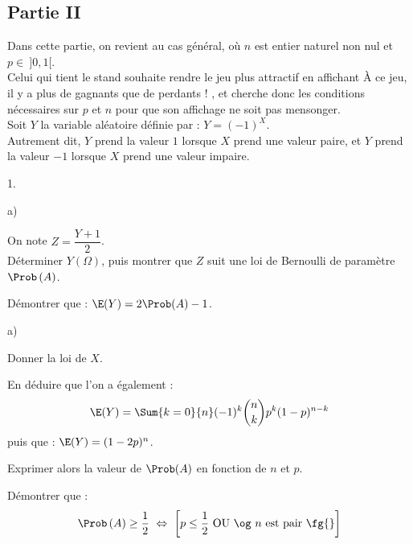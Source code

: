 \documentclass[11pt]{article}%
\begin{document}


\subsection*{Partie II}

\noindent
Dans cette partie, on revient au cas général, où $n$ est entier
naturel non nul et $p \in \ ]0,1[$.\\
Celui qui tient le stand souhaite rendre le jeu plus attractif en
affichant \og À ce jeu, il y a plus de gagnants que de perdants ! \fg,
et cherche donc les conditions nécessaires sur $p$ et $n$ pour que son
affichage ne soit pas mensonger.\\
Soit $Y$ la variable aléatoire définie par : $Y = (-1)^{X}$.\\
Autrement dit, $Y$ prend la valeur $1$ lorsque $X$ prend une valeur
paire, et $Y$ prend la valeur $-1$ lorsque $X$ prend une valeur
impaire.
\begin{noliste}{1.}
  \setlength{\itemsep}{4mm}
\item
  \begin{noliste}{a)} 
    \setlength{\itemsep}{2mm}
  \item On note $Z = \dfrac{Y + 1}{2}$.\\[.2cm]
    Déterminer $Y(\Omega)$, puis montrer que $Z$ suit une loi de
    Bernoulli de paramètre $\Prob\left( A \right)$.

    

  \item Démontrer que : $\E(Y) = 2 \Prob(A) - 1$.

    
  \end{noliste}




\item 
  \begin{noliste}{a)}
    \setlength{\itemsep}{2mm}
  \item Donner la loi de $X$.

    

  \item En déduire que l'on a également : 
    \[
    \E(Y) = \Sum{k = 0}{n} (-1)^{k} \dbinom{n}{k} p^{k}(1-p)^{n-k}
    \]
    puis que : $\E(Y) = (1-2p)^{n}$.

    
  \end{noliste}

\item Exprimer alors la valeur de $\Prob(A)$ en fonction de $n$ et
  $p$.

  




\item Démontrer que :
  \[
  \Prob\left(A\right) \geq \dfrac{1}{2} \ \Leftrightarrow \ \left[ p
    \leq \dfrac{1}{2} \hbox{ OU \og $n$ est pair \fg{}} \right]
  \]

  

\end{noliste}
\end{document}
